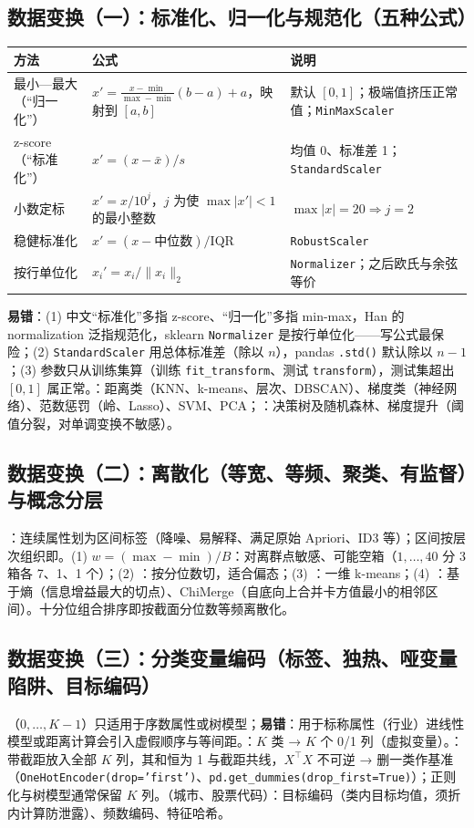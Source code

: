 \subsection{数据变换（一）：标准化、归一化与规范化（五种公式）}
\begin{center}\small
\begin{tabularx}{\linewidth}{@{}p{3.2cm}p{6.5cm}L@{}}
\toprule
方法 & 公式 & 说明\\
\midrule
最小—最大（“归一化”）& $x'=\frac{x-\min}{\max-\min}(b-a)+a$，映射到 $[a,b]$ & 默认 $[0,1]$；极端值挤压正常值；\texttt{MinMaxScaler}\\
z-score（“标准化”）& $x'=(x-\bar x)/s$ & 均值 0、标准差 1；\texttt{StandardScaler}\\
小数定标 & $x'=x/10^j$，$j$ 为使 $\max|x'|<1$ 的最小整数 & $\max|x|=20\Rightarrow j=2$\\
稳健标准化 & $x'=(x-\text{中位数})/\mathrm{IQR}$ & \texttt{RobustScaler}\\
按行单位化 & $x_i'=x_i/\|x_i\|_2$ & \texttt{Normalizer}；之后欧氏与余弦等价\\
\bottomrule
\end{tabularx}
\end{center}
\textbf{易错}：(1) 中文“标准化”多指 z-score、“归一化”多指 min-max，Han 的 normalization 泛指规范化，sklearn \texttt{Normalizer} 是按行单位化——写公式最保险；(2) \texttt{StandardScaler} 用总体标准差（除以 $n$），pandas \texttt{.std()} 默认除以 $n-1$；(3) 参数只从训练集算（训练 \texttt{fit\_transform}、测试 \texttt{transform}），测试集超出 $[0,1]$ 属正常。：距离类（KNN、k-means、层次、DBSCAN）、梯度类（神经网络）、范数惩罚（岭、Lasso）、SVM、PCA；：决策树及随机森林、梯度提升（阈值分裂，对单调变换不敏感）。

\subsection{数据变换（二）：离散化（等宽、等频、聚类、有监督）与概念分层}
：连续属性划为区间标签（降噪、易解释、满足原始 Apriori、ID3 等）；区间按层次组织即。(1)  $w=(\max-\min)/B$：对离群点敏感、可能空箱（$1,\dots,40$ 分 3 箱各 7、1、1 个）；(2) ：按分位数切，适合偏态；(3) ：一维 k-means；(4) ：基于熵（信息增益最大的切点）、ChiMerge（自底向上合并卡方值最小的相邻区间）。十分位组合排序即按截面分位数等频离散化。

\subsection{数据变换（三）：分类变量编码（标签、独热、哑变量陷阱、目标编码）}
（$0,\dots,K-1$）只适用于序数属性或树模型；\textbf{易错}：用于标称属性（行业）进线性模型或距离计算会引入虚假顺序与等间距。：$K$ 类 → $K$ 个 0/1 列（虚拟变量）。：带截距放入全部 $K$ 列，其和恒为 1 与截距共线，$X^\top X$ 不可逆 → 删一类作基准（\texttt{OneHotEncoder(drop='first')}、\texttt{pd.get\_dummies(drop\_first=True)}）；正则化与树模型通常保留 $K$ 列。（城市、股票代码）：目标编码（类内目标均值，须折内计算防泄露）、频数编码、特征哈希。

